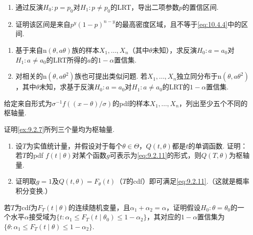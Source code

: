 \begin{exercise}\label{exercise:9.6}\leavevmode
\begin{enumerate}
\item 通过反演$H_0:p=p_0$对$H_1:p\ne p_0$的LRT，导出二项参数$p$的置信区间.
\item 证明该区间是来自$p^y(1-p)^{n-y}$的最高密度区域，且不等于\eqref{eq:10.4.4}中的区间.
\end{enumerate}
\end{exercise}
\begin{exercise}\label{exercise:9.7}\leavevmode
\begin{enumerate}
\item 基于来自$\mathrm n(\theta,a\theta)$族的样本$X_1,\ldots,X_n$（其中$\theta$未知），求反演$H_0:a=a_0$对$H_1:a\ne a_0$的LRT所得的$a$的$1-\alpha$置信集.
\item 对相关的$\mathrm n(\theta,a\theta^2)$族也可提出类似问题. 若$X_1,\ldots,X_n$独立同分布于$\mathrm n(\theta,a\theta^2)$，其中$\theta$未知，求基于反演$H_0:a=a_0$对$H_1:a\ne a_0$的LRT的$1-\alpha$置信集.
\end{enumerate}
\end{exercise}
\begin{exercise}\label{exercise:9.8}
给定来自形式为$\sigma^{-1}f((x-\theta)/\sigma)$的pdf的样本$X_1,\ldots,X_n$，列出至少五个不同的枢轴量.
\end{exercise}
\begin{exercise}\label{exercise:9.9}
证明\autoref{ex:9.2.7}所列三个量均为枢轴量.
\end{exercise}
\begin{exercise}\label{exercise:9.10}\leavevmode
\begin{enumerate}
\item 设$T$为实值统计量，并假设对于每个$\theta\in\Theta$，$Q(t,\theta)$都是$t$的单调函数. 证明：若$T$的pdf $f(t\mid\theta)$对某个函数$g$可表示为\eqref{eq:9.2.11}的形式，则$Q(T,\theta)$为枢轴量.
\item 证明取$g=1$及$Q(t,\theta)=F_\theta(t)$（$T$的cdf）即可满足\eqref{eq:9.2.11}.（这就是概率积分变换.）
\end{enumerate}
\end{exercise}
\begin{exercise}\label{exercise:9.11}
若$T$为cdf为$F_T(t\mid\theta)$的连续随机变量，且$\alpha_1+\alpha_2=\alpha$，证明假设$H_0:\theta=\theta_0$的一个水平$\alpha$接受域为$\{t:\alpha_1\le F_T(t\mid\theta_0)\le1-\alpha_2\}$，其对应的$1-\alpha$置信集为$\{\theta:\alpha_1\le F_T(t\mid\theta)\le1-\alpha_2\}$.
\end{exercise}
